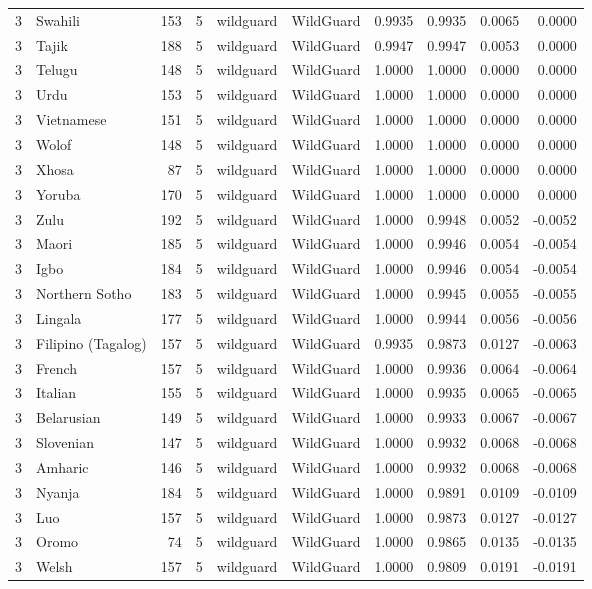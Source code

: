 \begin{tabular}{rlrrllrrrr}
3 & Swahili & 153 & 5 & wildguard & WildGuard & 0.9935 & 0.9935 & 0.0065 & 0.0000 \\
3 & Tajik & 188 & 5 & wildguard & WildGuard & 0.9947 & 0.9947 & 0.0053 & 0.0000 \\
3 & Telugu & 148 & 5 & wildguard & WildGuard & 1.0000 & 1.0000 & 0.0000 & 0.0000 \\
3 & Urdu & 153 & 5 & wildguard & WildGuard & 1.0000 & 1.0000 & 0.0000 & 0.0000 \\
3 & Vietnamese & 151 & 5 & wildguard & WildGuard & 1.0000 & 1.0000 & 0.0000 & 0.0000 \\
3 & Wolof & 148 & 5 & wildguard & WildGuard & 1.0000 & 1.0000 & 0.0000 & 0.0000 \\
3 & Xhosa & 87 & 5 & wildguard & WildGuard & 1.0000 & 1.0000 & 0.0000 & 0.0000 \\
3 & Yoruba & 170 & 5 & wildguard & WildGuard & 1.0000 & 1.0000 & 0.0000 & 0.0000 \\
3 & Zulu & 192 & 5 & wildguard & WildGuard & 1.0000 & 0.9948 & 0.0052 & -0.0052 \\
3 & Maori & 185 & 5 & wildguard & WildGuard & 1.0000 & 0.9946 & 0.0054 & -0.0054 \\
3 & Igbo & 184 & 5 & wildguard & WildGuard & 1.0000 & 0.9946 & 0.0054 & -0.0054 \\
3 & Northern Sotho & 183 & 5 & wildguard & WildGuard & 1.0000 & 0.9945 & 0.0055 & -0.0055 \\
3 & Lingala & 177 & 5 & wildguard & WildGuard & 1.0000 & 0.9944 & 0.0056 & -0.0056 \\
3 & Filipino (Tagalog) & 157 & 5 & wildguard & WildGuard & 0.9935 & 0.9873 & 0.0127 & -0.0063 \\
3 & French & 157 & 5 & wildguard & WildGuard & 1.0000 & 0.9936 & 0.0064 & -0.0064 \\
3 & Italian & 155 & 5 & wildguard & WildGuard & 1.0000 & 0.9935 & 0.0065 & -0.0065 \\
3 & Belarusian & 149 & 5 & wildguard & WildGuard & 1.0000 & 0.9933 & 0.0067 & -0.0067 \\
3 & Slovenian & 147 & 5 & wildguard & WildGuard & 1.0000 & 0.9932 & 0.0068 & -0.0068 \\
3 & Amharic & 146 & 5 & wildguard & WildGuard & 1.0000 & 0.9932 & 0.0068 & -0.0068 \\
3 & Nyanja & 184 & 5 & wildguard & WildGuard & 1.0000 & 0.9891 & 0.0109 & -0.0109 \\
3 & Luo & 157 & 5 & wildguard & WildGuard & 1.0000 & 0.9873 & 0.0127 & -0.0127 \\
3 & Oromo & 74 & 5 & wildguard & WildGuard & 1.0000 & 0.9865 & 0.0135 & -0.0135 \\
3 & Welsh & 157 & 5 & wildguard & WildGuard & 1.0000 & 0.9809 & 0.0191 & -0.0191 \\
\bottomrule
\end{tabular}
